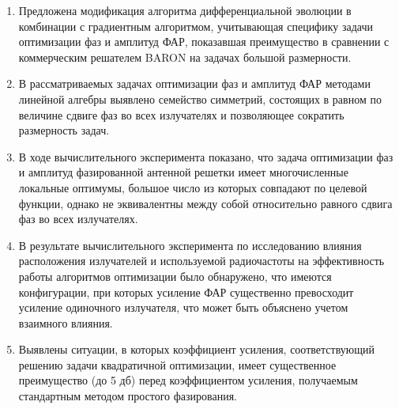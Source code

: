 \begin{enumerate}
\item Предложена модификация алгоритма дифференциальной эволюции в комбинации с градиентным алгоритмом, учитывающая специфику задачи оптимизации фаз и амплитуд ФАР, показавшая преимущество в сравнении с коммерческим решателем BARON на задачах большой размерности.
  \item В рассматриваемых задачах оптимизации фаз и амплитуд ФАР методами линейной алгебры выявлено семейство  симметрий, состоящих в равном по величине сдвиге фаз во всех излучателях и позволяющее сократить размерность задач.
  \item В ходе вычислительного эксперимента показано, что задача оптимизации фаз и амплитуд фазированной антенной решетки имеет многочисленные локальные оптимумы, большое число из которых совпадают по целевой функции, однако не эквивалентны между собой относительно равного сдвига фаз во всех излучателях.
  \item В результате вычислительного эксперимента по исследованию влияния расположения излучателей и используемой радиочастоты на эффективность работы алгоритмов оптимизации было обнаружено, что имеются конфигурации, при которых усиление ФАР существенно превосходит усиление одиночного излучателя, что может быть объяснено учетом взаимного влияния.
  \item Выявлены ситуации, в которых коэффициент усиления, соответствующий решению задачи квадратичной оптимизации, имеет существенное преимущество (до 5 дб) перед коэффициентом усиления, получаемым стандартным методом простого фазирования.
\end{enumerate}
